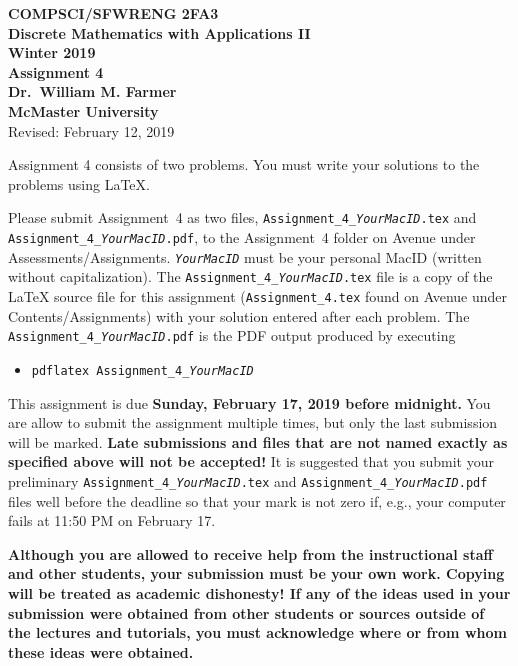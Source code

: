 \documentclass[11pt,fleqn]{article}
\begin{document}
\begin{center}

  {\large \textbf{COMPSCI/SFWRENG 2FA3}}\\[2mm]
  {\large \textbf{Discrete Mathematics with Applications II}}\\[2mm]
  {\large \textbf{Winter 2019}}\\[8mm]
  {\huge \textbf{Assignment 4}}\\[6mm]
  {\large \textbf{Dr.~William M. Farmer}}\\[2mm]
  {\large \textbf{McMaster University}}\\[6mm]
  {\large Revised: February 12, 2019}

\end{center}

\medskip

Assignment 4 consists of two problems.  You must write your solutions
to the problems using LaTeX.

Please submit Assignment~4 as two files,
\texttt{Assignment\_4\_\emph{YourMacID}.tex} and
\texttt{Assignment\_4\_\emph{YourMacID}.pdf}, to the Assignment~4
folder on Avenue under Assessments/Assignments.
\texttt{\emph{YourMacID}} must be your personal MacID (written without
capitalization).  The \texttt{Assignment\_4\_\emph{YourMacID}.tex}
file is a copy of the LaTeX source file for this assignment
(\texttt{Assignment\_4.tex} found on Avenue under
Contents/Assignments) with your solution entered after each problem.
The \texttt{Assignment\_4\_\emph{YourMacID}.pdf} is the PDF output
produced by executing

\begin{itemize}

  \item[] \texttt{pdflatex Assignment\_4\_\emph{YourMacID}}

\end{itemize}

This assignment is due \textbf{Sunday, February 17, 2019 before
  midnight.}  You are allow to submit the assignment multiple times,
but only the last submission will be marked.  \textbf{Late submissions
  and files that are not named exactly as specified above will not be
  accepted!}  It is suggested that you submit your preliminary
\texttt{Assignment\_4\_\emph{YourMacID}.tex} and
\texttt{Assignment\_4\_\emph{YourMacID}.pdf} files well before the
deadline so that your mark is not zero if, e.g., your computer fails
at 11:50 PM on February 17.

\textbf{Although you are allowed to receive help from the
  instructional staff and other students, your submission must be your
  own work.  Copying will be treated as academic dishonesty! If any of
  the ideas used in your submission were obtained from other students
  or sources outside of the lectures and tutorials, you must
  acknowledge where or from whom these ideas were obtained.}
\end{document}
